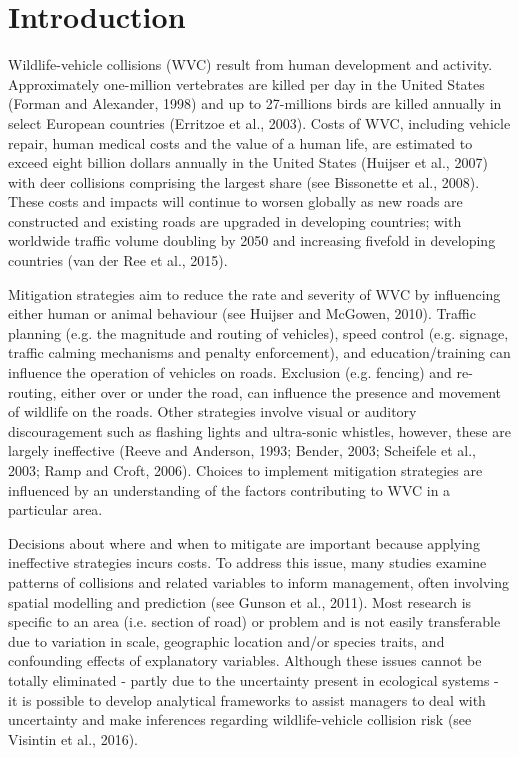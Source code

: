 \newpage
\section{Introduction}

Wildlife-vehicle collisions (WVC) result from human development and activity. Approximately one-million vertebrates are killed per day in the United States (Forman and Alexander, 1998) and up to 27-millions birds are killed annually in select European countries (Erritzoe et al., 2003).  Costs of WVC, including vehicle repair, human medical costs and the value of a human life, are estimated to exceed eight billion dollars annually in the United States (Huijser et al., 2007) with deer collisions comprising the largest share (see Bissonette et al., 2008).  These costs and impacts will continue to worsen globally as new roads are constructed and existing roads are upgraded in developing countries; with worldwide traffic volume doubling by 2050 and increasing fivefold in developing countries (van der Ree et al., 2015).

Mitigation strategies aim to reduce the rate and severity of WVC by influencing either human or animal behaviour (see Huijser and McGowen, 2010).  Traffic planning (e.g. the magnitude and routing of vehicles), speed control (e.g. signage, traffic calming mechanisms and penalty enforcement), and education/training can influence the operation of vehicles on roads.  Exclusion (e.g. fencing) and re-routing, either over or under the road, can influence the presence and movement of wildlife on the roads.  Other strategies involve visual or auditory discouragement such as flashing lights and ultra-sonic whistles, however, these are largely ineffective (Reeve and Anderson, 1993; Bender, 2003; Scheifele et al., 2003; Ramp and Croft, 2006). Choices to implement mitigation strategies are influenced by an understanding of the factors contributing to WVC in a particular area.

Decisions about where and when to mitigate are important because applying ineffective strategies incurs costs.  To address this issue, many studies examine patterns of collisions and related variables to inform management, often involving spatial modelling and prediction (see Gunson et al., 2011).  Most research is specific to an area (i.e. section of road) or problem and is not easily transferable due to variation in scale, geographic location and/or species traits, and confounding effects of explanatory variables.  Although these issues cannot be totally eliminated - partly due to the uncertainty present in ecological systems - it is possible to develop analytical frameworks to assist managers to deal with uncertainty and make inferences regarding wildlife-vehicle collision risk (see Visintin et al., 2016).

